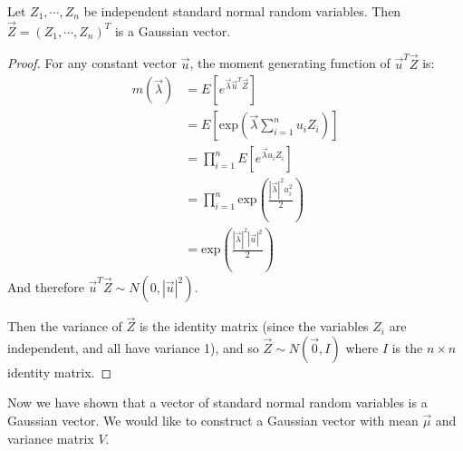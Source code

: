 \documentclass[../Main.tex]{subfiles}
\begin{document}
\begin{proposition}
    Let $Z_1, \cdots, Z_n$ be independent standard normal random variables. Then $\vec{Z} = (Z_1, \cdots, Z_n)^T$ is a Gaussian vector.
    \label{propStdVectorIsGaussian}
\end{proposition}
\begin{proof}
    For any constant vector $\vec{u}$, the moment generating function of $\vec{u}^T \vec{Z}$ is:
    \begin{align*}
        m(\vec{\lambda}) &= E\left[e^{\vec{\lambda} \vec{u}^T \vec{Z}}\right] \\
        &= E\left[\text{exp}\left(\vec{\lambda} \sum_{i = 1}^n u_i Z_i\right)\right] \\
        &= \prod_{i=1}^{n} E[e^{\vec{\lambda} u_i Z_i}] \\
        &= \prod_{i = 1}^n \text{exp}\left({\frac{|\vec{\lambda}|^2 u_i^2}{2}}\right) \\
        &= \text{exp}\left({\frac{|\vec{\lambda}|^2 |\vec{u}|^2}{2}}\right)
    \end{align*}
    And therefore $\vec{u}^T \vec{Z} \sim N(0, |\vec{u}|^2)$.

    Then the variance of $\vec{Z}$ is the identity matrix (since the variables $Z_i$ are independent, and all have variance 1), and so $\vec{Z} \sim N(\vec{0}, I)$ where $I$ is the $n \times n$ identity matrix.
\end{proof}
Now we have shown that a vector of standard normal random variables is a Gaussian vector. We would like to construct a Gaussian vector with mean $\vec{\mu}$ and variance matrix $V$.
\end{document}
